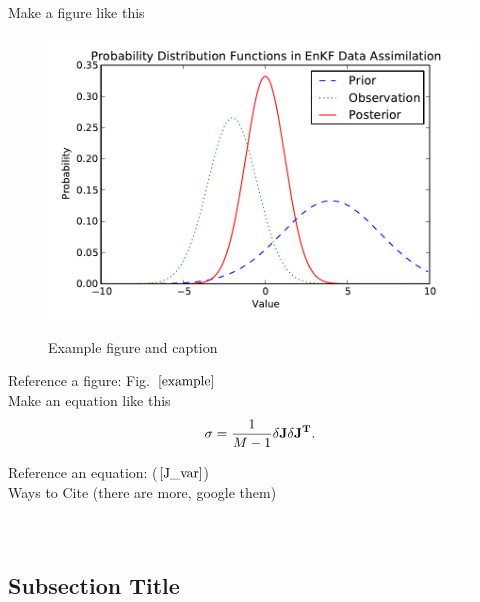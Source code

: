 \documentclass{ttuthes2014}
\newcommand{\tab}{\hspace*{2em}}  %
\begin{document}
\tab Make a figure like this
\begin{figure}[!htb]
  \centering
  \noindent\includegraphics[width=30pc,angle=0]{./example.pdf}\\
  \caption{Example figure and caption}
\label{example}
\end{figure}

\tab Reference a figure: Fig.~$\ref{example}$ \\

\tab Make an equation like this
\begin{align}\label{J_var}
	\sigma = \frac{1}{M-1} \delta\bf{J} \delta{\mathbf{J}}^T.
\end{align}

\tab Reference an equation: ($\ref{J_var}$) \\
\tab Ways to Cite (there are more, google them) \\
\citep{Ancell2013} \\
\cite{Ancell2013} \\

\subsection{Subsection Title} %


\backmatter


\end{document}
